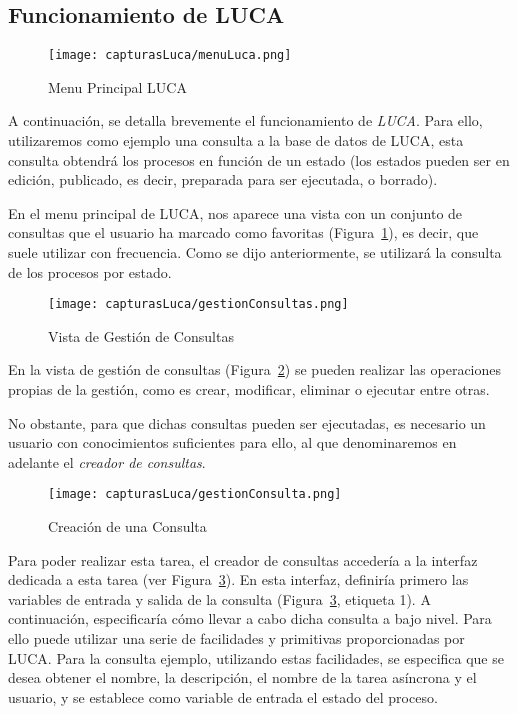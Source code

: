 \subsection{Funcionamiento de LUCA}
\begin{figure}[H]
	\centering
	\texttt{[image: capturasLuca/menuLuca.png]}
	\caption{Menu Principal LUCA}
	\label{fig:menuLuca}
\end{figure}


A continuación, se detalla brevemente el funcionamiento de \emph{LUCA}. Para ello, utilizaremos como ejemplo una consulta a la base de datos de LUCA, esta consulta obtendrá los procesos en función de un estado (los estados pueden ser en edición, publicado, es decir, preparada para ser ejecutada, o borrado).



En el menu principal de LUCA, nos aparece una vista con un conjunto de consultas que el usuario ha marcado como favoritas (Figura~\ref{fig:menuLuca}), es decir, que suele utilizar con frecuencia. Como se dijo anteriormente, se utilizará la consulta de los procesos por estado.

\begin{figure}[H]
	\centering
	\texttt{[image: capturasLuca/gestionConsultas.png]}
	\caption{Vista de Gestión de Consultas}
	\label{fig:gestionConsultas}
\end{figure}

En la vista de gestión de consultas (Figura~\ref{fig:gestionConsultas}) se pueden realizar las operaciones propias de la gestión, como es crear, modificar, eliminar o ejecutar entre otras.

No obstante, para que dichas consultas pueden ser ejecutadas, es necesario un usuario con conocimientos suficientes para ello, al que denominaremos en adelante el \emph{creador de consultas}.

\begin{figure}[H]
	\centering
	\texttt{[image: capturasLuca/gestionConsulta.png]}
	\caption{Creación de una Consulta}
	\label{fig:gestionConsulta}
\end{figure}

Para poder realizar esta tarea, el creador de consultas accedería a la interfaz dedicada a esta tarea (ver Figura~\ref{fig:gestionConsulta}). En esta interfaz, definiría primero las variables de entrada y salida de la consulta (Figura~\ref{fig:gestionConsulta}, etiqueta 1). A continuación, especificaría cómo llevar a cabo dicha consulta a bajo nivel. Para ello puede utilizar una serie de facilidades y primitivas proporcionadas por LUCA. Para la consulta ejemplo, utilizando estas facilidades, se especifica que se desea obtener el nombre, la descripción, el nombre de la tarea asíncrona y el usuario, y se establece como variable de entrada el estado del proceso.


